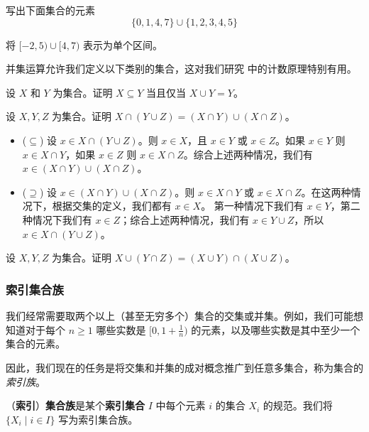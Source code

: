 \begin{exercise}
写出下面集合的元素
\[ \{ 0, 1, 4, 7 \} \cup \{ 1, 2, 3, 4, 5 \} \]
\end{exercise}

\begin{exercise}
将 $[-2,5) \cup [4,7)$ 表示为单个区间。
\end{exercise}

并集运算允许我们定义以下类别的集合，这对我们研究  中的计数原理特别有用。

\begin{exercise}
设 $X$ 和 $Y$ 为集合。证明 $X \subseteq Y$ 当且仅当 $X \cup Y = Y$。
\end{exercise}

\begin{example}
\label{exIntersectionDistributesOverUnion}
设 $X,Y,Z$ 为集合。证明 $X \cap (Y \cup Z) = (X \cap Y) \cup (X \cap Z)$。
\begin{itemize}
\item ($\subseteq$) 设 $x \in X \cap (Y \cup Z)$。则 $x \in X$，且 $x \in Y$ 或 $x \in Z$。如果 $x \in Y$ 则 $x \in X \cap Y$，如果 $x \in Z$ 则 $x \in X \cap Z$。综合上述两种情况，我们有 $x \in (X \cap Y) \cup (X \cap Z)$。
\item ($\supseteq$) 设 $x \in (X \cap Y) \cup (X \cap Z)$。则 $x \in X \cap Y$ 或 $x \in X \cap Z$。在这两种情况下，根据交集的定义，我们都有 $x \in X$。
第一种情况下我们有 $x \in Y$，第二种情况下我们有 $x \in Z$；综合上述两种情况，我们有 $x \in Y \cup Z$，所以 $x \in X \cap (Y \cup Z)$。
\end{itemize}
\end{example}

\begin{exercise}
\label{exUnionDistributesOverIntersection}
设 $X,Y,Z$ 为集合。证明 $X \cup (Y \cap Z) = (X \cup Y) \cap (X \cup Z)$。
\end{exercise}

\subsubsection*{索引集合族}

我们经常需要取两个以上（甚至无穷多个）集合的交集或并集。例如，我们可能想知道对于每个 $n \ge 1$ 哪些实数是 $[0, 1+\frac{1}{n})$ 的元素，以及哪些实数是其中至少一个集合的元素。

因此，我们现在的任务是将交集和并集的成对概念推广到任意多集合，称为集合的\textit{索引族}。

\begin{definition}
\label{defIndexedFamily}
（\textbf{索引}）\textbf{集合族}是某个\textbf{索引集合} $I$ 中每个元素 $i$ 的集合 $X_i$ 的规范。我们将 $\{ X_i \mid i \in I \}$ 写为索引集合族。
\end{definition}

